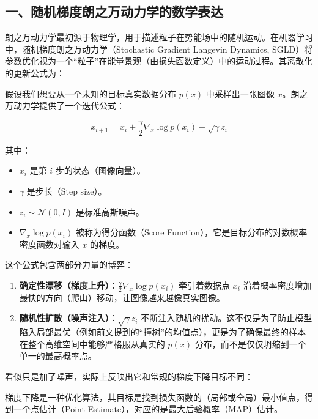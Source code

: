 \hypertarget{ux4e00ux968fux673aux68afux5ea6ux6717ux4e4bux4e07ux52a8ux529bux5b66ux7684ux6570ux5b66ux8868ux8fbe}{%
\subsection{一、随机梯度朗之万动力学的数学表达}\label{ux4e00ux968fux673aux68afux5ea6ux6717ux4e4bux4e07ux52a8ux529bux5b66ux7684ux6570ux5b66ux8868ux8fbe}}

朗之万动力学最初源于物理学，用于描述粒子在势能场中的随机运动。在机器学习中，随机梯度朗之万动力学（Stochastic Gradient Langevin Dynamics, SGLD）将参数优化视为一个``粒子''在能量景观（由损失函数定义）中的运动过程。其离散化的更新公式为：

假设我们想要从一个未知的目标真实数据分布 \(p(x)\) 中采样出一张图像 \(x\)。朗之万动力学提供了一个迭代公式：

\[
x_{i+1}=x_i+\frac{\gamma}{2}\nabla_x\log p(x_i)+\sqrt{\gamma}z_i
\]

其中：

\begin{itemize}
\tightlist
\item
  \(x_i\) 是第 \(i\) 步的状态（图像向量）。
\item
  \(\gamma\) 是步长（Step size）。
\item
  \(z_i\sim\mathcal{N}(0,I)\) 是标准高斯噪声。
\item
  \(\nabla_x\log p(x_i)\) 被称为得分函数（Score Function），它是目标分布的对数概率密度函数对输入 \(x\) 的梯度。
\end{itemize}

这个公式包含两部分力量的博弈：

\begin{enumerate}
\def\labelenumi{\arabic{enumi}.}
\tightlist
\item
  \textbf{确定性漂移（梯度上升）}：\(\frac{\gamma}{2}\nabla_x\log p(x_i)\) 牵引着数据点 \(x_i\) 沿着概率密度增加最快的方向（爬山）移动，让图像越来越像真实图像。
\item
  \textbf{随机性扩散（噪声注入）}：\(\sqrt{\gamma}z_i\) 不断注入随机的扰动。这不仅是为了防止模型陷入局部最优（例如前文提到的``撞树''的均值点），更是为了确保最终的样本在整个高维空间中能够严格服从真实的 \(p(x)\) 分布，而不是仅仅坍缩到一个单一的最高概率点。
\end{enumerate}

看似只是加了噪声，实际上反映出它和常规的梯度下降目标不同：

梯度下降是一种优化算法，其目标是找到损失函数的（局部或全局）最小值点，得到一个点估计（Point Estimate），对应的是最大后验概率（MAP）估计。


